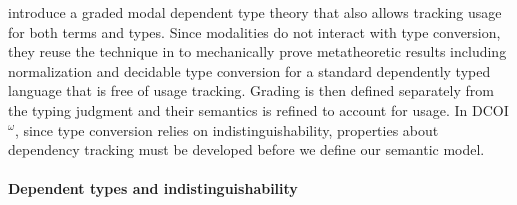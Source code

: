 \documentclass[acmsmall, screen=true, nonacm=true,
  review=\ifpublic false\else true\fi,
  anonymous=\ifanonymous true\else false\fi
]{acmart}
\makeatletter
\newcommand{\dcoi}{DCOI\@\xspace}
\newcommand{\name}{\texorpdfstring{DCOI$^{\omega}$\@\xspace}{DCOI-omega}}
\makeatother
\begin{document}
\citet{abel:grade} introduce a graded modal dependent
type theory that also allows tracking usage for both terms and
types. %
Since modalities do not interact with type conversion,
they reuse the technique in \citet{abel:dectt} to mechanically prove
metatheoretic results including normalization and decidable type
conversion for a standard dependently typed language that is free of
usage tracking.  Grading is then defined separately from the typing
judgment and their semantics is refined to account for usage. In
\name, since type conversion relies on indistinguishability,
properties about dependency tracking must be developed before we
define our semantic model.

\paragraph{Dependent types and indistinguishability}

\end{document}
